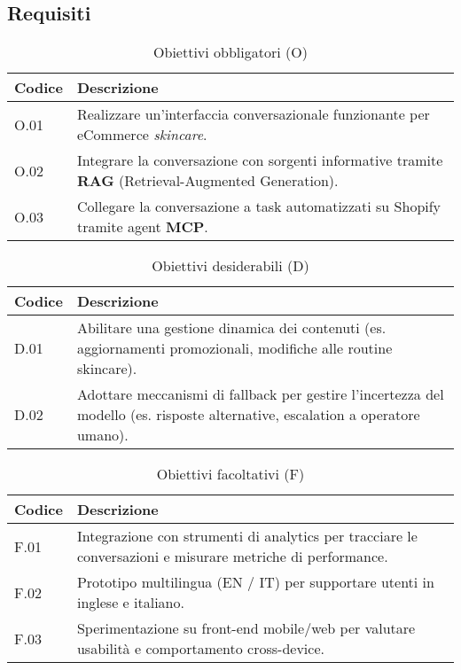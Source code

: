 \subsection{Requisiti}

\begin{table}[H]
    \centering
    \caption{Obiettivi obbligatori (O)}
    \begin{tabularx}{\textwidth}{@{}l X@{}}
      \toprule
      \textbf{Codice} & \textbf{Descrizione} \\
      \midrule
      O.01 & Realizzare un'interfaccia conversazionale funzionante per eCommerce \textit{skincare}. \\
      \midrule
      O.02 & Integrare la conversazione con sorgenti informative tramite \textbf{RAG} (Retrieval-Augmented Generation). \\
      \midrule
      O.03 & Collegare la conversazione a task automatizzati su Shopify tramite agent \textbf{MCP}. \\
      \bottomrule
    \end{tabularx}
  \end{table}
  
  \vspace{8pt}
  
  \begin{table}[H]
    \centering
    \caption{Obiettivi desiderabili (D)}
    \begin{tabularx}{\textwidth}{@{}l X@{}}
      \toprule
      \textbf{Codice} & \textbf{Descrizione} \\
      \midrule
      D.01 & Abilitare una gestione dinamica dei contenuti (es. aggiornamenti promozionali, modifiche alle routine skincare). \\
      \midrule
      D.02 & Adottare meccanismi di fallback per gestire l'incertezza del modello (es. risposte alternative, escalation a operatore umano). \\
      \bottomrule
    \end{tabularx}
  \end{table}
  
  \vspace{8pt}
  
  \begin{table}[H]
    \centering
    \caption{Obiettivi facoltativi (F)}
    \begin{tabularx}{\textwidth}{@{}l X@{}}
      \toprule
      \textbf{Codice} & \textbf{Descrizione} \\
      \midrule
      F.01 & Integrazione con strumenti di analytics per tracciare le conversazioni e misurare metriche di performance. \\
      \midrule
      F.02 & Prototipo multilingua (EN / IT) per supportare utenti in inglese e italiano. \\
      \midrule
      F.03 & Sperimentazione su front-end mobile/web per valutare usabilità e comportamento cross-device. \\
      \bottomrule
    \end{tabularx}
  \end{table}

